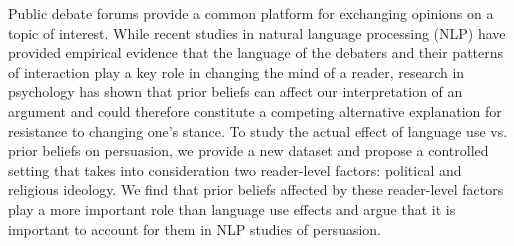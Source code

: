Public debate forums provide a common platform for exchanging opinions on a topic of interest. While recent studies in natural language processing (NLP) have provided empirical evidence that the language of the debaters and their patterns of interaction play a key role in changing the mind of a reader, research in psychology has shown that prior beliefs can affect our interpretation of an argument and could therefore constitute a competing alternative explanation for resistance to changing one's stance. To study the actual effect of language use vs. prior beliefs on persuasion, we provide a new dataset and propose a controlled setting that takes into consideration two reader-level factors: political and religious ideology. We find that prior beliefs affected by these reader-level factors play a more important role than language use effects and argue that it is important to account for them in NLP studies of persuasion.
